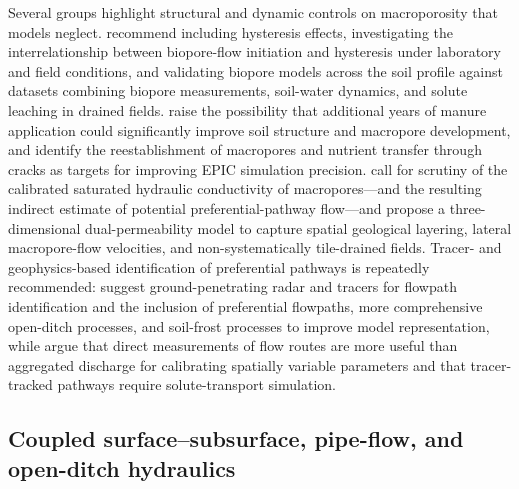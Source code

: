 Several groups highlight structural and dynamic controls on macroporosity that
models neglect. \textcite{Holbak2021} recommend including hysteresis effects,
investigating the interrelationship between biopore-flow initiation and
hysteresis under laboratory and field conditions, and validating biopore
models across the soil profile against datasets combining biopore
measurements, soil-water dynamics, and solute leaching in drained fields.
\textcite{Zhao2001} raise the possibility that additional years of manure
application could significantly improve soil structure and macropore
development, and \textcite{Wang2022} identify the reestablishment of
macropores and nutrient transfer through cracks as targets for improving EPIC
simulation precision. \textcite{Varvaris2018} call for scrutiny of the
calibrated saturated hydraulic conductivity of macropores---and the resulting
indirect estimate of potential preferential-pathway flow---and propose a
three-dimensional dual-permeability model to capture spatial geological
layering, lateral macropore-flow velocities, and non-systematically
tile-drained fields. Tracer- and geophysics-based identification of
preferential pathways is repeatedly recommended: \textcite{Tähtikarhu2025}
suggest ground-penetrating radar and tracers for flowpath identification and
the inclusion of preferential flowpaths, more comprehensive open-ditch
processes, and soil-frost processes to improve model representation, while
\textcite{Salo2017} argue that direct measurements of flow routes are more
useful than aggregated discharge for calibrating spatially variable parameters
and that tracer-tracked pathways require solute-transport simulation.

\subsection{Coupled surface--subsurface, pipe-flow, and open-ditch hydraulics}

